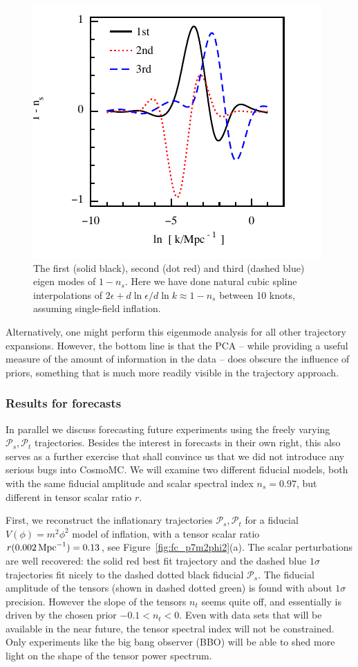 \documentclass[a4paper,11pt]{article}
\def\mpc{{\rm\,Mpc}}
\def\mpc{{\rm\,Mpc}}
\newcommand{\pscalar}{{\mathcal{P}_s}}
\newcommand{\ptensor}{{\mathcal{P}_t}}
\begin{document}
\begin{figure}
  \includegraphics[width=0.9\linewidth]{p10nscubicspline_PCA} 
  \caption{The first (solid black), second (dot red) and third (dashed
  blue) eigen modes of $1-n_s$. Here we have done natural cubic spline
  interpolations of $2\epsilon + d\ln\epsilon/d\ln k\approx 1-n_s$
  between 10 knots, assuming single-field inflation.}
  \label{fig:eigenmodes}
\end{figure}
Alternatively, one might perform this eigenmode analysis for all other
trajectory expansions. However, the bottom line is that the PCA --
while providing a useful measure of the amount of information in the
data -- does obscure the influence of priors, something that is much
more readily visible in the trajectory approach.

\subsubsection{Results for forecasts}
In parallel we discuss forecasting future experiments using the freely
varying $\pscalar,\ptensor$ trajectories. Besides the interest in
forecasts in their own right, this also serves as a further exercise
that shall convince us that we did not introduce any serious bugs into
CosmoMC. We will examine two different fiducial models, both with the
same fiducial amplitude and scalar spectral index $n_s=0.97$, but
different in tensor scalar ratio $r$.

First, we reconstruct the inflationary trajectories $\pscalar,
\ptensor$ for a fiducial $V(\phi)=m^2\phi^2$ model of inflation, with
a tensor scalar ratio $r(0.002\mpc^{-1})=0.13$, see
Figure~\ref{fig:fc_p7m2phi2}(a). The scalar perturbations are well
recovered: the solid red best fit trajectory and the dashed blue
$1\sigma$ trajectories fit nicely to the dashed dotted black fiducial
$\pscalar$. The fiducial amplitude of the tensors (shown in dashed
dotted green) is found with about $1\sigma$ precision. However the
slope of the tensors $n_t$ seems quite off, and essentially is driven
by the chosen prior $-0.1<n_t<0$.  Even with data sets that will be
available in the near future, the tensor spectral index will not be
constrained. Only experiments like the big bang observer (BBO) will be
able to shed more light on the shape of the tensor power spectrum.
\end{document}

